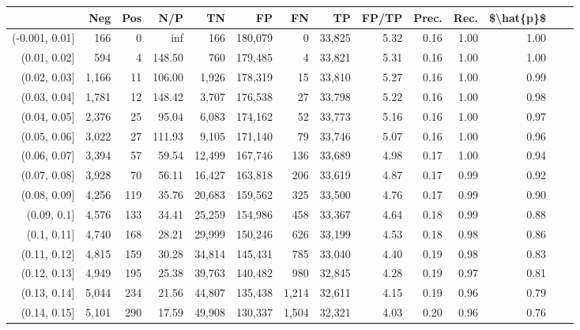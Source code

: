 \begin{tabular}{rrrrrrrrrrrrrr}
\toprule
{} &    Neg &  Pos &     N/P &       TN &       FP &      FN &      TP & FP/TP & Prec. &  Rec. & \$\textbackslash hat\{p\}\$ \\
\midrule
(-0.001, 0.01] &    166 &    0 &     inf &      166 &  180,079 &       0 &  33,825 &  5.32 &  0.16 &  1.00 &      1.00 \\
(0.01, 0.02]   &    594 &    4 &  148.50 &      760 &  179,485 &       4 &  33,821 &  5.31 &  0.16 &  1.00 &      1.00 \\
(0.02, 0.03]   &  1,166 &   11 &  106.00 &    1,926 &  178,319 &      15 &  33,810 &  5.27 &  0.16 &  1.00 &      0.99 \\
(0.03, 0.04]   &  1,781 &   12 &  148.42 &    3,707 &  176,538 &      27 &  33,798 &  5.22 &  0.16 &  1.00 &      0.98 \\
(0.04, 0.05]   &  2,376 &   25 &   95.04 &    6,083 &  174,162 &      52 &  33,773 &  5.16 &  0.16 &  1.00 &      0.97 \\
(0.05, 0.06]   &  3,022 &   27 &  111.93 &    9,105 &  171,140 &      79 &  33,746 &  5.07 &  0.16 &  1.00 &      0.96 \\
(0.06, 0.07]   &  3,394 &   57 &   59.54 &   12,499 &  167,746 &     136 &  33,689 &  4.98 &  0.17 &  1.00 &      0.94 \\
(0.07, 0.08]   &  3,928 &   70 &   56.11 &   16,427 &  163,818 &     206 &  33,619 &  4.87 &  0.17 &  0.99 &      0.92 \\
(0.08, 0.09]   &  4,256 &  119 &   35.76 &   20,683 &  159,562 &     325 &  33,500 &  4.76 &  0.17 &  0.99 &      0.90 \\
(0.09, 0.1]    &  4,576 &  133 &   34.41 &   25,259 &  154,986 &     458 &  33,367 &  4.64 &  0.18 &  0.99 &      0.88 \\
(0.1, 0.11]    &  4,740 &  168 &   28.21 &   29,999 &  150,246 &     626 &  33,199 &  4.53 &  0.18 &  0.98 &      0.86 \\
(0.11, 0.12]   &  4,815 &  159 &   30.28 &   34,814 &  145,431 &     785 &  33,040 &  4.40 &  0.19 &  0.98 &      0.83 \\
(0.12, 0.13]   &  4,949 &  195 &   25.38 &   39,763 &  140,482 &     980 &  32,845 &  4.28 &  0.19 &  0.97 &      0.81 \\
(0.13, 0.14]   &  5,044 &  234 &   21.56 &   44,807 &  135,438 &   1,214 &  32,611 &  4.15 &  0.19 &  0.96 &      0.79 \\
(0.14, 0.15]   &  5,101 &  290 &   17.59 &   49,908 &  130,337 &   1,504 &  32,321 &  4.03 &  0.20 &  0.96 &      0.76 \\

\end{tabular}
